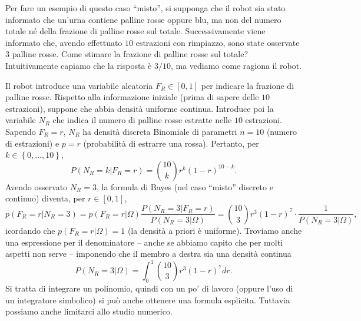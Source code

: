 \documentclass[
  italian,
  letterpaper,
]{book}
\newcommand{\cur}[1]{\left\{ #1 \right\}}
\theoremstyle{definition}
\theoremstyle{remark}
\begin{document}
\protect{}\label{bayes-continuo}
Per fare un esempio di questo caso ``misto'', si supponga che il robot
sia stato informato che un'urna contiene palline rosse oppure blu, ma
non del numero totale né della frazione di palline rosse sul totale.
Successivamente viene informato che, avendo effettuato \(10\) estrazioni
con rimpiazzo, sono state osservate \(3\) palline rosse. Come stimare la
frazione di palline rosse sul totale? Intuitivamente capiamo che la
risposta è \(3/10\), ma vediamo come ragiona il robot.

Il robot introduce una variabile aleatoria \(F_R \in [0,1]\) per
indicare la frazione di palline rosse. Rispetto alla informazione
iniziale (prima di sapere delle \(10\) estrazioni), suppone che abbia
densità uniforme continua. Introduce poi la variabile \(N_R\) che indica
il numero di palline rosse estratte nelle \(10\) estrazioni. Sapendo
\(F_R = r\), \(N_R\) ha densità discreta Binomiale di parametri
\(n =10\) (numero di estrazioni) e \(p = r\) (probabilità di estrarre
una rossa). Pertanto, per \(k \in \cur{0, \ldots, 10}\),
\[ P(N_R = k | F_R = r) = { 10 \choose k} r^k (1-r)^{10-k}.\] Avendo
osservato \(N_R =3\), la formula di Bayes (nel caso ``misto'' discreto e
continuo) diventa, per \(r \in [0,1]\),
\[ p( F_R = r | N_R = 3) = p(F_R = r|\Omega) \frac{ P(N_R=3 | F_R = r)}{P(N_R = 3|\Omega)} = { 10 \choose 3} r^3 (1-r)^{7} \cdot \frac{1}{P(N_R = 3 | \Omega)},\]
icordando che \(p(F_R = r| \Omega) = 1\) (la densità a priori è
uniforme). Troviamo anche una espressione per il denominatore -- anche
se abbiamo capito che per molti aspetti non serve -- imponendo che il
membro a destra sia una densità continua
\[ P(N_R = 3 | \Omega) = \int_0^1 { 10 \choose 3} r^3 (1-r)^{7} d r.\]
Si tratta di integrare un polinomio, quindi con un po' di lavoro (oppure
l'uso di un integratore simbolico) si può anche ottenere una formula
esplicita. Tuttavia possiamo anche limitarci allo studio numerico.
\end{document}
